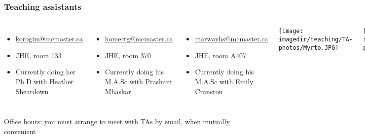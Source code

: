 \begin{frame}\frametitle{Teaching assistants}
	
	\begin{columns}[c]
			{\color{myGreen}{Myrto Korogiannaki}}
			\begin{itemize}
				\item	\url{korogim@mcmaster.ca}
				\item	JHE, room 133
				\item	Currently doing her Ph.D with Heather Sheardown
			\end{itemize}
			
			\vspace{0.2cm}
			{\color{myGreen}{Tyler Homer}}
			\begin{itemize}
				\item	\url{homertg@mcmaster.ca}
				\item	JHE, room 370
				\item	Currently doing his M.A.Sc with Prashant Mhaskar
			\end{itemize}
			
			\vspace{0.2cm}
			{\color{myGreen}{Heera Marway}}
			\begin{itemize}
				\item	\url{marwayhs@mcmaster.ca}
				\item	JHE, room A407
				\item	Currently doing his M.A.Sc with Emily Cranston
			\end{itemize}
			\centerline{\texttt{[image: \\imagedir/teaching/TA-photos/Myrto.JPG]}}
			\centerline{\texttt{[image: \\imagedir/teaching/TA-photos/homert.JPG]}}
			\centerline{\texttt{[image: \\imagedir/teaching/TA-photos/marway.jpg]}}
			
	\end{columns}
	
	\vspace{0.3cm}
	{\color{myOrange}\scriptsize{Office hours: you must arrange to meet with TAs by email, when mutually convenient}}
\end{frame}

